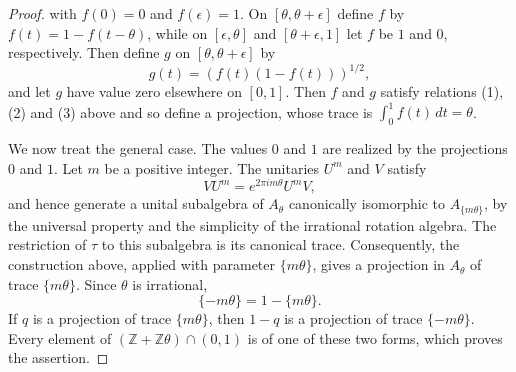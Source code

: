 \documentclass{book}
\begin{document}
\begin{proof}
with \(f(0)=0\) and \(f(\epsilon)=1\). On \([\theta,\theta+\epsilon]\) define \(f\)
by \(f(t)=1-f(t-\theta)\), while on \([\epsilon,\theta]\) and \([\theta+\epsilon,1]\)
let \(f\) be \(1\) and \(0\), respectively. Then define \(g\) on \([\theta,\theta+\epsilon]\) by
\[
  g(t)=(f(t)(1-f(t)))^{1/2},
\]  
and let \(g\) have value zero elsewhere on \([0,1]\). 
Then \(f\) and \(g\) satisfy relations (1), (2) and (3) above and so define 
a projection, whose trace is \(\int_0^1 f(t)\,dt=\theta\).\par
We now treat the general case. The values \(0\) and \(1\) are realized by
the projections \(0\) and \(1\). Let \(m\) be a positive integer. The
unitaries \(U^m\) and \(V\) satisfy
\[
  VU^m=e^{2\pi i m\theta}U^mV,
\]
and hence generate a unital subalgebra of \(A_\theta\) canonically
isomorphic to \(A_{\{m\theta\}}\), by the universal property and the
simplicity of the irrational rotation algebra. The restriction of \(\tau\) to this
subalgebra is its canonical trace. Consequently, the construction above,
applied with parameter \(\{m\theta\}\), gives a projection in \(A_\theta\)
of trace \(\{m\theta\}\). Since \(\theta\) is irrational,
\[
  \{-m\theta\}=1-\{m\theta\}.
\]
If \(q\) is a projection of trace \(\{m\theta\}\), then \(1-q\) is a
projection of trace \(\{-m\theta\}\). Every element of
\((\mathbb{Z}+\mathbb{Z}\theta)\cap(0,1)\) is of one of these two forms,
which proves the assertion.
\end{proof}
\end{document}
